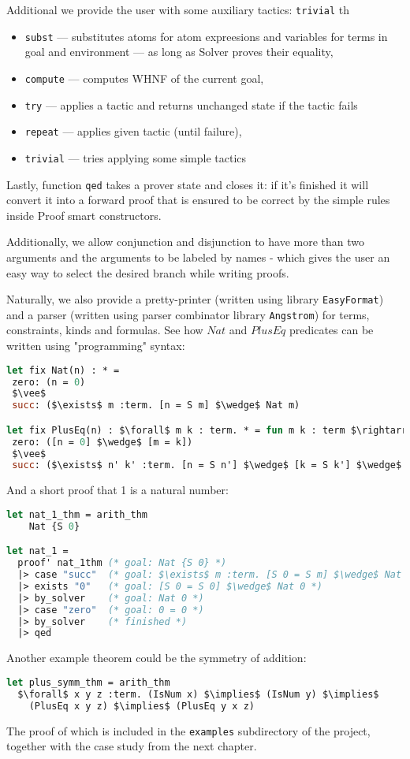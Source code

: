 \documentclass[english, mgr]{iithesis}
\renewcommand{\tt}[1]{\texttt{\small{#1}}}
\begin{document}
Additional we provide the user with some auxiliary tactics:
\tt{trivial} th
\begin{itemize}
\item \tt{subst} --- substitutes atoms for atom expreesions
  and variables for terms in goal and environment
  --- as long as Solver proves their equality,
\item \tt{compute} --- computes WHNF of the current goal,
\item \tt{try} --- applies a tactic and returns unchanged state if the tactic fails
\item \tt{repeat} --- applies given tactic (until failure),
\item \tt{trivial} ---  tries applying some simple tactics
\end{itemize}

Lastly, function \tt{qed} takes a prover state and closes it:
if it's finished it will convert it into a forward proof that is ensured to be
correct by the simple rules inside Proof smart constructors.

Additionally, we allow conjunction and disjunction to have more than two arguments
and the  arguments to be labeled by names
- which gives the user an easy way to select the desired branch while writing proofs.

Naturally, we also provide a pretty-printer (written using library \tt{EasyFormat})
and a parser (written using parser combinator library \tt{Angstrom})
for terms, constraints, kinds and formulas.
See how $Nat$ and $PlusEq$ predicates can be written using "programming" syntax:
\begin{lstlisting}[mathescape, language=OCaml]
let fix Nat(n) : * =
 zero: (n = 0)
 $\vee$
 succ: ($\exists$ m :term. [n = S m] $\wedge$ Nat m)

let fix PlusEq(n) : $\forall$ m k : term. * = fun m k : term $\rightarrow$
 zero: ([n = 0] $\wedge$ [m = k])
 $\vee$
 succ: ($\exists$ n' k' :term. [n = S n'] $\wedge$ [k = S k'] $\wedge$ PlusEq n' m k')
\end{lstlisting}
And a short proof that 1 is a natural number:
\begin{lstlisting}[mathescape, language=OCaml]
let nat_1_thm = arith_thm
    Nat {S 0}

let nat_1 =
  proof' nat_1thm (* goal: Nat {S 0} *)
  |> case "succ"  (* goal: $\exists$ m :term. [S 0 = S m] $\wedge$ Nat m *)
  |> exists "0"   (* goal: [S 0 = S 0] $\wedge$ Nat 0 *)
  |> by_solver    (* goal: Nat 0 *)
  |> case "zero"  (* goal: 0 = 0 *)
  |> by_solver    (* finished *)
  |> qed
\end{lstlisting}
Another example theorem could be the symmetry of addition:
\begin{lstlisting}[mathescape, language=OCaml]
let plus_symm_thm = arith_thm
  $\forall$ x y z :term. (IsNum x) $\implies$ (IsNum y) $\implies$
    (PlusEq x y z) $\implies$ (PlusEq y x z)
\end{lstlisting}
The proof of which is included in the \tt{examples} subdirectory of the project,
together with the case study from the next chapter.
\end{document}
